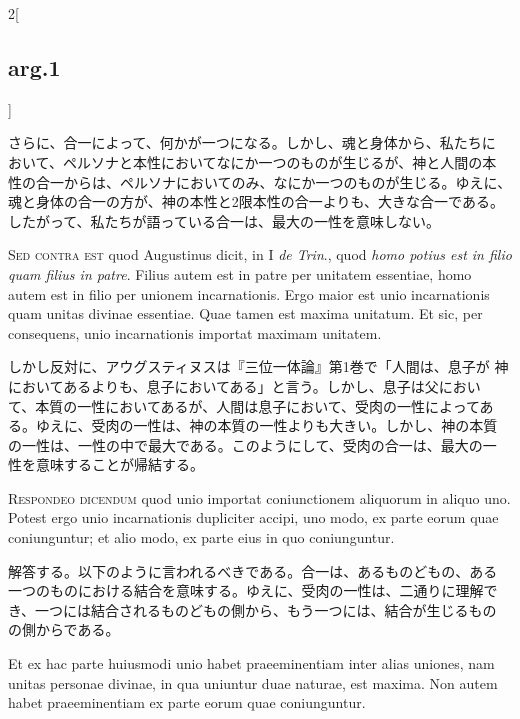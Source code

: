 \documentclass[paper=a4paper,fontsize=10pt,jafontsize=9pt,titlepage]{jlreq}
\begin{document}
\begin{paracol}{2}[\subsection{arg.1}]
\switchcolumn

さらに、合一によって、何かが一つになる。しかし、魂と身体から、私たちに
おいて、ペルソナと本性においてなにか一つのものが生じるが、神と人間の本
性の合一からは、ペルソナにおいてのみ、なにか一つのものが生じる。ゆえに、
魂と身体の合一の方が、神の本性と2限本性の合一よりも、大きな合一である。
したがって、私たちが語っている合一は、最大の一性を意味しない。

\switchcolumn*[\subsection{s.c.}]

{\scshape Sed contra est} quod Augustinus dicit, in I {\itshape de
Trin}., quod {\itshape homo potius est in filio quam filius in
patre}. Filius autem est in patre per unitatem essentiae, homo autem
est in filio per unionem incarnationis. Ergo maior est unio
incarnationis quam unitas divinae essentiae. Quae tamen est maxima
unitatum. Et sic, per consequens, unio incarnationis importat maximam
unitatem.

\switchcolumn

しかし反対に、アウグスティヌスは『三位一体論』第1巻で「人間は、息子が
神においてあるよりも、息子においてある」と言う。しかし、息子は父におい
て、本質の一性においてあるが、人間は息子において、受肉の一性によってあ
る。ゆえに、受肉の一性は、神の本質の一性よりも大きい。しかし、神の本質
の一性は、一性の中で最大である。このようにして、受肉の合一は、最大の一
性を意味することが帰結する。


{\scshape Respondeo dicendum} quod unio importat coniunctionem
aliquorum in aliquo uno. Potest ergo unio incarnationis dupliciter
accipi, uno modo, ex parte eorum quae coniunguntur; et alio modo, ex
parte eius in quo coniunguntur.

\switchcolumn

解答する。以下のように言われるべきである。合一は、あるものどもの、ある
一つのものにおける結合を意味する。ゆえに、受肉の一性は、二通りに理解で
き、一つには結合されるものどもの側から、もう一つには、結合が生じるもの
の側からである。

\switchcolumn*

Et ex hac parte huiusmodi unio habet praeeminentiam inter alias
uniones, nam unitas personae divinae, in qua uniuntur duae naturae,
est maxima. Non autem habet praeeminentiam ex parte eorum quae
coniunguntur.


\end{paracol}
\end{document}
